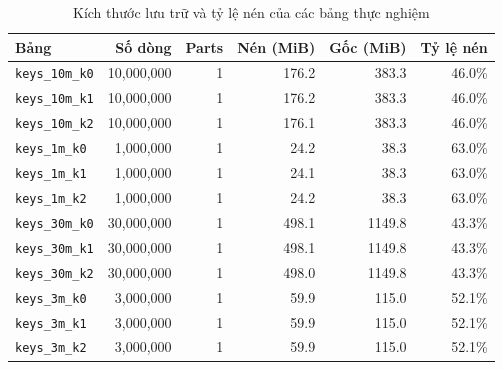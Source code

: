 \begin{table}[htbp]
\centering
\caption{Kích thước lưu trữ và tỷ lệ nén của các bảng thực nghiệm}
\label{tab:storage_summary}
\begin{tabular}{lrrrrr}
\toprule
\textbf{Bảng} & \textbf{Số dòng} & \textbf{Parts} & \textbf{Nén (MiB)} & \textbf{Gốc (MiB)} & \textbf{Tỷ lệ nén} \\
\midrule
    \texttt{keys_10m_k0} & 10,000,000 & 1 & 176.2 & 383.3 & 46.0\% \\
    \texttt{keys_10m_k1} & 10,000,000 & 1 & 176.2 & 383.3 & 46.0\% \\
    \texttt{keys_10m_k2} & 10,000,000 & 1 & 176.1 & 383.3 & 46.0\% \\
    \texttt{keys_1m_k0} & 1,000,000 & 1 & 24.2 & 38.3 & 63.0\% \\
    \texttt{keys_1m_k1} & 1,000,000 & 1 & 24.1 & 38.3 & 63.0\% \\
    \texttt{keys_1m_k2} & 1,000,000 & 1 & 24.2 & 38.3 & 63.0\% \\
    \texttt{keys_30m_k0} & 30,000,000 & 1 & 498.1 & 1149.8 & 43.3\% \\
    \texttt{keys_30m_k1} & 30,000,000 & 1 & 498.1 & 1149.8 & 43.3\% \\
    \texttt{keys_30m_k2} & 30,000,000 & 1 & 498.0 & 1149.8 & 43.3\% \\
    \texttt{keys_3m_k0} & 3,000,000 & 1 & 59.9 & 115.0 & 52.1\% \\
    \texttt{keys_3m_k1} & 3,000,000 & 1 & 59.9 & 115.0 & 52.1\% \\
    \texttt{keys_3m_k2} & 3,000,000 & 1 & 59.9 & 115.0 & 52.1\% \\
\bottomrule
\end{tabular}
\end{table}
